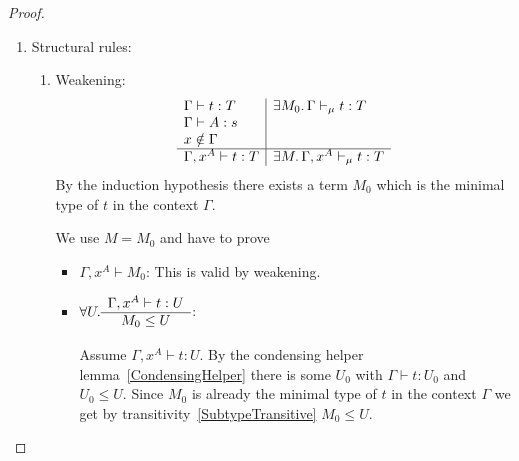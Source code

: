 \begin{theorem}
\begin{proof}
\begin{enumerate}
            \item Structural rules:
            \begin{enumerate}
                \item Weakening:
                $$
                \begin{array}{l|l}
                    \Gamma \vdash t: T
                    & \exists M_0.\, \Gamma \vdash_\mu t: T
                    \\
                    \Gamma \vdash A: s
                    \\
                    x \notin \Gamma
                    \\
                    \hline
                    \Gamma, x^A \vdash t : T
                    &
                    \exists M.\, \Gamma, x^A \vdash_\mu t: T
                \end{array}
                $$
                    By the induction hypothesis there exists a term $M_0$ which
                    is the minimal type of $t$ in the context $\Gamma$.

                    We use $M = M_0$ and have to prove
                    \begin{itemize}
                        \item $\Gamma,x^A \vdash M_0$: This is valid by
                            weakening.

                        \item
                            $\forall U.
                            \begin{array}{c} \Gamma,x^A \vdash t : U \\ \hline M_0 \le U\end{array}
                            $:

                            Assume $\Gamma,x^A \vdash t : U$. By the condensing
                            helper lemma~\ref{CondensingHelper} there is some
                            $U_0$ with $\Gamma \vdash t: U_0$ and $U_0 \le U$.
                            Since $M_0$ is already the minimal type of $t$ in
                            the context $\Gamma$ we get by
                            transitivity~\ref{SubtypeTransitive} $M_0 \le U$.
                    \end{itemize}


\end{enumerate}
\end{enumerate}
\end{proof}
\end{theorem}
